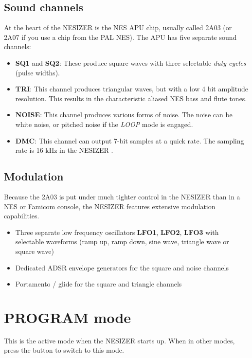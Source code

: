 \documentclass[a4paper, 12p, titlepaget]{book}
\newcommand \name {NESIZER }
\newcommand {\btn}[1] {\framebox{\textbf{\footnotesize #1}}}
\newcommand {\lbl}[1] {\emph{\footnotesize #1}}
\begin{document}
\subsection{Sound channels}

At the heart of the \name is the NES APU chip, usually called 2A03 (or 2A07 if you use a chip from the PAL NES). The APU has five separate sound channels:

\begin{itemize}
\item \textbf{SQ1} and \textbf{SQ2}: These produce square waves with three selectable \emph{duty cycles} (pulse widths). 
\item \textbf{TRI}: This channel produces triangular waves, but with a low 4 bit amplitude resolution. This results in the characteristic aliased NES bass and flute tones.
\item \textbf{NOISE}: This channel produces various forms of noise. The noise can be white noise, or pitched noise if the \lbl{LOOP} mode is engaged.
\item \textbf{DMC}: This channel can output 7-bit samples at a quick rate. The sampling rate is 16 kHz in the \name. 
\end{itemize}

\subsection{Modulation}

Because the 2A03 is put under much tighter control in the \name than in a NES or Famicom console, the \name features extensive modulation capabilities. 

\begin{itemize}
\item Three separate low frequency oscillators \textbf{LFO1}, \textbf{LFO2}, \textbf{LFO3} with selectable waveforms (ramp up, ramp down, sine wave, triangle wave or square wave)
\item Dedicated ADSR envelope generators for the square and noise channels
\item Portamento / glide for the square and triangle channels
\end{itemize}

\section{PROGRAM mode}

This is the active mode when the \name starts up. When in other modes, press the \btn{PROGRAM} button to switch to this mode. 
\end{document}
